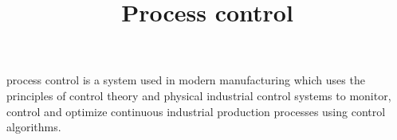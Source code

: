 \documentclass[a4paper]{article}
\title{Process control}
\date{}
\begin{document}
\maketitle
    process control is a system used in modern manufacturing which uses the principles of control theory and physical industrial control systems to monitor, control and optimize continuous industrial production processes using control algorithms. 
\end{document}
